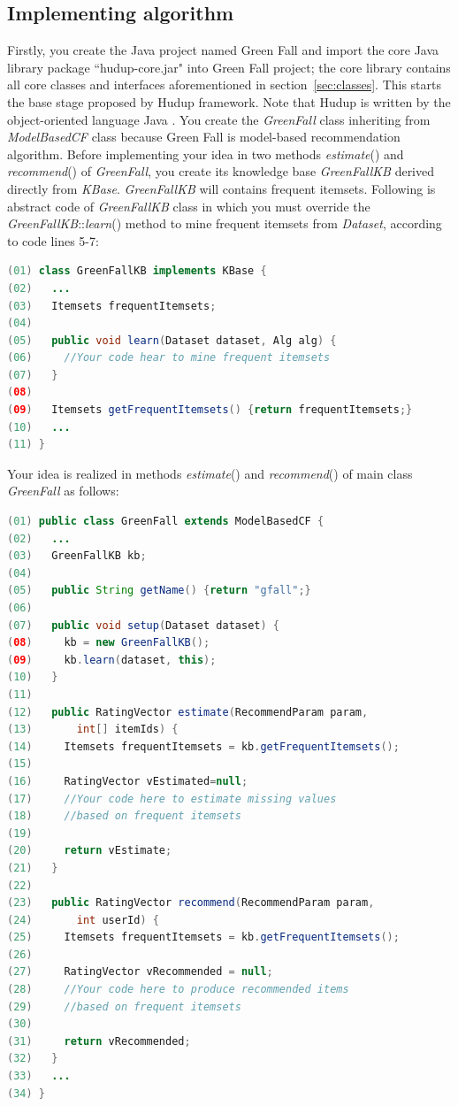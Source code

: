 \documentclass[a4paper]{llncs}
\begin{document}
\subsection{Implementing algorithm}
\label{subsec:tutorial-implementing}
Firstly, you create the Java project named Green Fall and import the core Java library package ``hudup-core.jar" into Green Fall project; the core library contains all core classes and interfaces aforementioned in section~\ref{sec:classes}. This starts the base stage proposed by Hudup framework. Note that Hudup is written by the object-oriented language Java \cite{oracle2014java}. You create the \textit{GreenFall} class inheriting from \textit{ModelBasedCF} class because Green Fall is model-based recommendation algorithm. Before implementing your idea in two methods \textit{estimate}() and \textit{recommend}() of \textit{GreenFall}, you create its knowledge base \textit{GreenFallKB} derived directly from \textit{KBase}. \textit{GreenFallKB} will contains frequent itemsets. Following is abstract code of \textit{GreenFallKB} class in which you must override the \textit{GreenFallKB}::\textit{learn}() method to mine frequent itemsets from \textit{Dataset}, according to code lines 5-7:
\begin{small}
\begin{lstlisting}[language=Java]
(01) class GreenFallKB implements KBase {
(02)   ...
(03)   Itemsets frequentItemsets;
(04)
(05)   public void learn(Dataset dataset, Alg alg) {
(06)     //Your code hear to mine frequent itemsets
(07)   }
(08)
(09)   Itemsets getFrequentItemsets() {return frequentItemsets;}
(10)   ...
(11) }
\end{lstlisting}
\end{small}
Your idea is realized in methods \textit{estimate}() and \textit{recommend}() of main class \textit{GreenFall} as follows:
\begin{small}
\begin{lstlisting}[language = Java]
(01) public class GreenFall extends ModelBasedCF {
(02)   ...
(03)   GreenFallKB kb;
(04)
(05)   public String getName() {return "gfall";}
(06)
(07)   public void setup(Dataset dataset) {
(08)     kb = new GreenFallKB();
(09)     kb.learn(dataset, this);
(10)   }
(11)
(12)   public RatingVector estimate(RecommendParam param,
(13)       int[] itemIds) {
(14)     Itemsets frequentItemsets = kb.getFrequentItemsets();
(15) 
(16)     RatingVector vEstimated=null;
(17)     //Your code here to estimate missing values
(18)     //based on frequent itemsets
(19)
(20)     return vEstimate;
(21)   }
(22)
(23)   public RatingVector recommend(RecommendParam param,
(24)       int userId) {
(25)     Itemsets frequentItemsets = kb.getFrequentItemsets();
(26)
(27)     RatingVector vRecommended = null;
(28)     //Your code here to produce recommended items
(29)     //based on frequent itemsets
(30)
(31)     return vRecommended;
(32)   }
(33)   ...
(34) }
\end{lstlisting}
\end{small}
\end{document}

